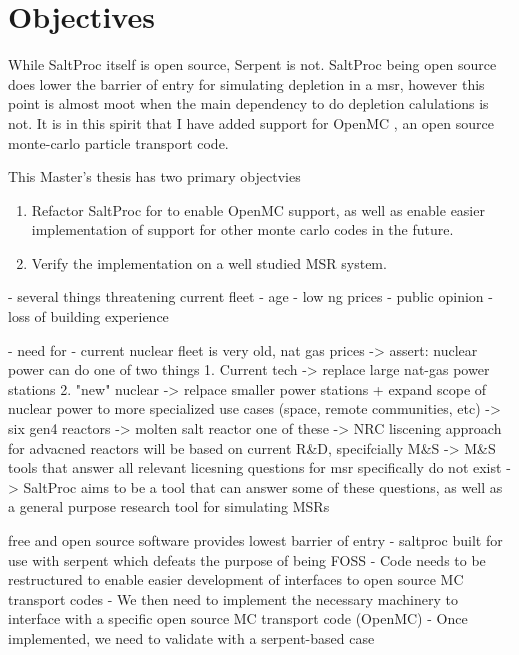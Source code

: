 \section{Objectives}%
\label{sec:objectives}

While SaltProc itself is open source, Serpent is not. SaltProc being open source does lower the barrier of entry for simulating depletion in a \Gls{msr}, however this point is almost moot when the main dependency to do depletion calulations is not. It is in this spirit that I have added support for OpenMC \cite{romano_openmc_2015}, an open source monte-carlo particle transport code.

This Master's thesis has two primary objectvies
\begin{enumerate}
    \item Refactor SaltProc for to enable OpenMC support, as well as enable easier implementation of support for other monte carlo codes in the future. 
    \item Verify the implementation on a well studied MSR system.
\end{enumerate}


- several things threatening current fleet
  - age
  - low ng prices
  - public opinion
  - loss of building experience

- need for 
- current nuclear fleet is very old, nat gas prices
 -> assert: nuclear power can do one of two things
    1. Current tech -> replace large nat-gas power stations 
    2. "new" nuclear -> relpace smaller power stations + expand scope
        of nuclear power to more specialized use cases (space, remote communities, etc)
-> six gen4 reactors -> molten salt reactor one of these
-> NRC liscening approach for advacned reactors will be based on current R\&D, specifcially M\&S
-> M\&S tools that answer all relevant licesning questions for msr specifically do not exist
-> SaltProc aims to be a tool that can answer some of these questions, as well as a general purpose
    research tool for simulating MSRs


 free and open source software provides lowest barrier of entry
 - saltproc built for use with serpent which defeats the purpose of being
    FOSS
 - Code needs to be restructured to enable easier development of interfaces to 
 open source MC transport codes
 - We then need to implement the necessary machinery to interface with a specific
    open source MC transport code (OpenMC)
 - Once implemented, we need to validate with a serpent-based case
